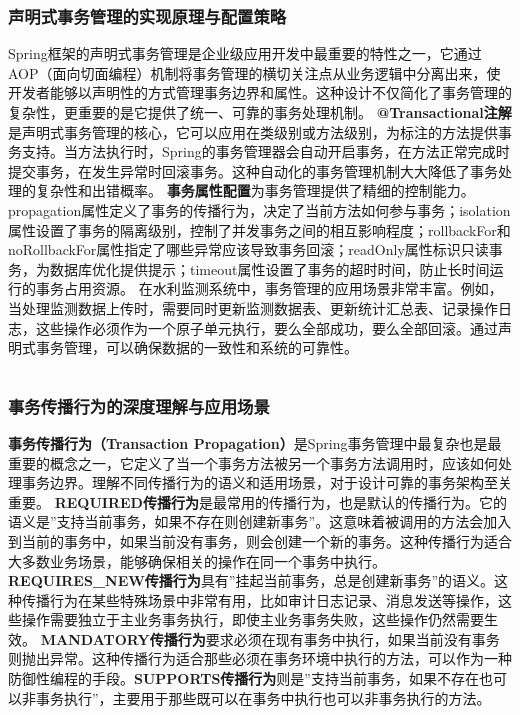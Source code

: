 \subsubsection{声明式事务管理的实现原理与配置策略}\label{ux58f0ux660eux5f0fux4e8bux52a1ux7ba1ux7406ux7684ux5b9eux73b0ux539fux7406ux4e0eux914dux7f6eux7b56ux7565}
Spring框架的声明式事务管理是企业级应用开发中最重要的特性之一，它通过AOP（面向切面编程）机制将事务管理的横切关注点从业务逻辑中分离出来，使开发者能够以声明性的方式管理事务边界和属性。这种设计不仅简化了事务管理的复杂性，更重要的是它提供了统一、可靠的事务处理机制。
\textbf{@Transactional注解}是声明式事务管理的核心，它可以应用在类级别或方法级别，为标注的方法提供事务支持。当方法执行时，Spring的事务管理器会自动开启事务，在方法正常完成时提交事务，在发生异常时回滚事务。这种自动化的事务管理机制大大降低了事务处理的复杂性和出错概率。
\textbf{事务属性配置}为事务管理提供了精细的控制能力。propagation属性定义了事务的传播行为，决定了当前方法如何参与事务；isolation属性设置了事务的隔离级别，控制了并发事务之间的相互影响程度；rollbackFor和noRollbackFor属性指定了哪些异常应该导致事务回滚；readOnly属性标识只读事务，为数据库优化提供提示；timeout属性设置了事务的超时时间，防止长时间运行的事务占用资源。
在水利监测系统中，事务管理的应用场景非常丰富。例如，当处理监测数据上传时，需要同时更新监测数据表、更新统计汇总表、记录操作日志，这些操作必须作为一个原子单元执行，要么全部成功，要么全部回滚。通过声明式事务管理，可以确保数据的一致性和系统的可靠性。
\begin{lstlisting}[language=Java] \end{lstlisting}
\subsubsection{事务传播行为的深度理解与应用场景}\label{ux4e8bux52a1ux4f20ux64adux884cux4e3aux7684ux6df1ux5ea6ux7406ux89e3ux4e0eux5e94ux7528ux573aux666f}
\textbf{事务传播行为（Transaction
Propagation）}是Spring事务管理中最复杂也是最重要的概念之一，它定义了当一个事务方法被另一个事务方法调用时，应该如何处理事务边界。理解不同传播行为的语义和适用场景，对于设计可靠的事务架构至关重要。
\textbf{REQUIRED传播行为}是最常用的传播行为，也是默认的传播行为。它的语义是''支持当前事务，如果不存在则创建新事务''。这意味着被调用的方法会加入到当前的事务中，如果当前没有事务，则会创建一个新的事务。这种传播行为适合大多数业务场景，能够确保相关的操作在同一个事务中执行。
\textbf{REQUIRES\_NEW传播行为}具有''挂起当前事务，总是创建新事务''的语义。这种传播行为在某些特殊场景中非常有用，比如审计日志记录、消息发送等操作，这些操作需要独立于主业务事务执行，即使主业务事务失败，这些操作仍然需要生效。
\textbf{MANDATORY传播行为}要求必须在现有事务中执行，如果当前没有事务则抛出异常。这种传播行为适合那些必须在事务环境中执行的方法，可以作为一种防御性编程的手段。\textbf{SUPPORTS传播行为}则是''支持当前事务，如果不存在也可以非事务执行''，主要用于那些既可以在事务中执行也可以非事务执行的方法。
\begin{lstlisting}[language=Java] \end{lstlisting}
